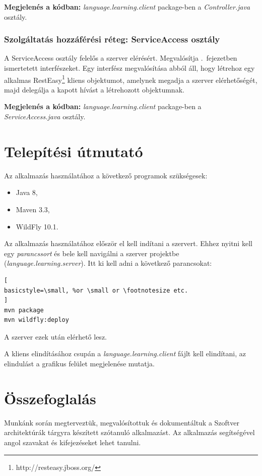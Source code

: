 \documentclass[11pt, a4paper]{article}
\begin{document}
     \textbf{Megjelenés a kódban:} \textit{language.learning.client} package-ben a \textit{Controller.java} osztály.
     
     \subsubsection{Szolgáltatás hozzáférési réteg: ServiceAccess osztály}
     
     A ServiceAccess osztály felelős a szerver elérésért. Megvalósítja .~fejezetben ismertetett interfészeket. Egy interfész megvalósítása abból áll, hogy létrehoz egy alkalmas RestEasy\footnote{http://resteasy.jboss.org/} kliens objektumot, amelynek megadja a szerver elérhetőségét, majd delegálja a kapott hívást a létrehozott objektumnak.
     
     \textbf{Megjelenés a kódban:} \textit{language.learning.client} package-ben a \textit{ServiceAccess.java} osztály.
     
    \section{Telepítési útmutató}
    \label{sec:telepítés}
    Az alkalmazás használatához a következő programok szükségesek:
    \begin{itemize}
    	\item Java 8,
    	\item Maven 3.3,
    	\item WildFly 10.1.
    \end{itemize}

	Az alkalmazás használatához először el kell indítani a szervert. Ehhez nyitni kell egy \emph{parancssort} és bele kell navigálni a szerver projektbe (\textsl{language.learning.server}). Itt ki kell adni a következő parancsokat:
\begin{lstlisting}[
basicstyle=\small, %or \small or \footnotesize etc.
]
mvn package
mvn wildfly:deploy
\end{lstlisting}
	A szerver ezek után elérhető lesz.
	
	A kliens elindításához csupán a \textsl{language.learning.client} fájlt kell elindítani, az elindulást a grafikus felület megjelenése mutatja.
	
	\section{Összefoglalás}
	\label{sec:összefoglalás}
	Munkánk során megterveztük, megvalósítottuk és dokumentáltuk a Szoftver architektúrák tárgyra készített szótanuló alkalmazást. Az alkalmazás segítségével angol szavakat és kifejezéseket lehet tanulni.
	
\end{document}
